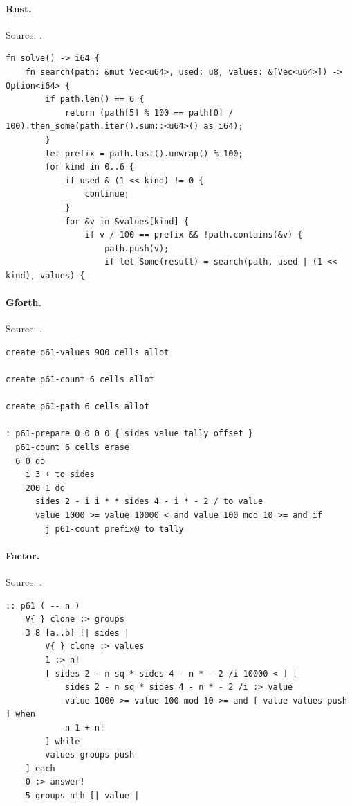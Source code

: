 \paragraph{Rust.} Source: .
\begin{lstlisting}
fn solve() -> i64 {
    fn search(path: &mut Vec<u64>, used: u8, values: &[Vec<u64>]) -> Option<i64> {
        if path.len() == 6 {
            return (path[5] % 100 == path[0] / 100).then_some(path.iter().sum::<u64>() as i64);
        }
        let prefix = path.last().unwrap() % 100;
        for kind in 0..6 {
            if used & (1 << kind) != 0 {
                continue;
            }
            for &v in &values[kind] {
                if v / 100 == prefix && !path.contains(&v) {
                    path.push(v);
                    if let Some(result) = search(path, used | (1 << kind), values) {
\end{lstlisting}

\paragraph{Gforth.} Source: .
\begin{lstlisting}
create p61-values 900 cells allot

create p61-count 6 cells allot

create p61-path 6 cells allot

: p61-prepare 0 0 0 0 { sides value tally offset }
  p61-count 6 cells erase
  6 0 do
    i 3 + to sides
    200 1 do
      sides 2 - i i * * sides 4 - i * - 2 / to value
      value 1000 >= value 10000 < and value 100 mod 10 >= and if
        j p61-count prefix@ to tally
\end{lstlisting}

\paragraph{Factor.} Source: .
\begin{lstlisting}
:: p61 ( -- n )
    V{ } clone :> groups
    3 8 [a..b] [| sides |
        V{ } clone :> values
        1 :> n!
        [ sides 2 - n sq * sides 4 - n * - 2 /i 10000 < ] [
            sides 2 - n sq * sides 4 - n * - 2 /i :> value
            value 1000 >= value 100 mod 10 >= and [ value values push ] when
            n 1 + n!
        ] while
        values groups push
    ] each
    0 :> answer!
    5 groups nth [| value |
\end{lstlisting}

